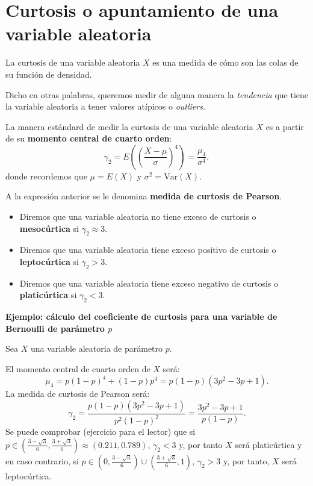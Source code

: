 \documentclass[
  letterpaper,
  DIV=11,
  numbers=noendperiod]{scrreprt}
\begin{document}
\hypertarget{curtosis-o-apuntamiento-de-una-variable-aleatoria}{%
\section{Curtosis o apuntamiento de una variable
aleatoria}\label{curtosis-o-apuntamiento-de-una-variable-aleatoria}}

La curtosis de una variable aleatoria \(X\) es una medida de cómo son
las colas de su función de densidad.

Dicho en otras palabras, queremos medir de alguna manera la
\emph{tendencia} que tiene la variable aleatoria a tener valores
atípicos o \emph{outliers}.

La manera estándard de medir la curtosis de una variable aleatoria \(X\)
es a partir de su \textbf{momento central de cuarto orden}: \[
\gamma_2 = E\left(\left(\frac{X-\mu}{\sigma}\right)^4\right) = \frac{\mu_4}{\sigma^4},
\] donde recordemos que \(\mu=E(X)\) y \(\sigma^2 =\mathrm{Var}(X)\).

A la expresión anterior se le denomina \textbf{medida de curtosis de
Pearson}.

\begin{itemize}
\item
  Diremos que una variable aleatoria no tiene exceso de curtosis o
  \textbf{mesocúrtica} si \(\gamma_2 \approx 3\).
\item
  Diremos que una variable aleatoria tiene exceso positivo de curtosis o
  \textbf{leptocúrtica} si \(\gamma_2 >3\).
\item
  Diremos que una variable aleatoria tiene exceso negativo de curtosis o
  \textbf{platicúrtica} si \(\gamma_2 <3\).
\end{itemize}

\textbf{Ejemplo: cálculo del coeficiente de curtosis para una variable
de Bernoulli de parámetro \(p\)}

Sea \(X\) una variable aleatoria de parámetro \(p\).

El momento central de cuarto orden de \(X\) será: \[
\mu_4 = p (1-p)^4 +(1-p)p^4 = p (1-p) (3 p^2-3p+1).
\] La medida de curtosis de Pearson será: \[
\gamma_2 = \frac{p (1-p) (3 p^2-3p+1)}{p^2 (1-p)^2} = \frac{3 p^2-3p+1}{p(1-p)}.
\] Se puede comprobar (ejercicio para el lector) que si
\(p\in \left(\frac{3-\sqrt{3}}{6},\frac{3+\sqrt{3}}{6}\right)\approx (0.211,0.789)\),
\(\gamma_2 <3\) y, por tanto \(X\) será platicúrtica y en caso
contrario, si
\(p\in \left(0,\frac{3-\sqrt{3}}{6}\right)\cup \left(\frac{3+\sqrt{3}}{6},1\right)\),
\(\gamma_2 >3\) y, por tanto, \(X\) será leptocúrtica.
\end{document}
